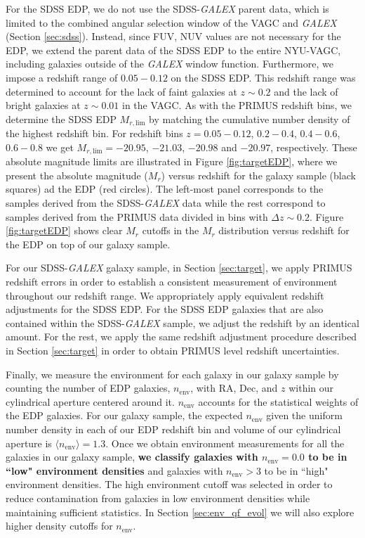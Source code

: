 \documentclass{emulateapj}
\begin{document}
For the SDSS EDP, we do not use the SDSS-{\em GALEX} parent data,
which is limited to the combined angular selection window of the
VAGC and {\em GALEX} (Section \ref{sec:sdss}). Instead, since FUV, NUV
values are not necessary for the EDP, we extend the parent data of the
SDSS EDP to the entire NYU-VAGC, including galaxies outside of the
{\em GALEX} window function. Furthermore, we impose a redshift range
of $0.05-0.12$ on the SDSS EDP. This redshift range was determined to
account for the lack of faint galaxies at $z \sim 0.2$ and the lack of
bright galaxies at $z \sim 0.01$ in the VAGC. As with the PRIMUS
redshift bins, we determine the SDSS EDP $M_{r, \mathrm{lim}}$ by matching
the cumulative number density of the highest redshift bin. For
redshift bins $z = 0.05-0.12$, $0.2-0.4$, $0.4-0.6$, $0.6-0.8$ we get
$M_{r,\mathrm{lim}} = -20.95$, $-21.03$, $-20.98$ and $-20.97$,
respectively. These absolute magnitude limits are illustrated in
Figure \ref{fig:targetEDP}, where we present the absolute magnitude ($M_{r}$) versus redshift for the galaxy sample (black squares) ad the EDP (red circles). 
The left-most panel corresponds to the samples derived from the SDSS-{\em GALEX} data while the rest correspond to samples derived from the PRIMUS data divided in bins with $\Delta z \sim 0.2$. 
Figure \ref{fig:targetEDP} shows clear $M_r$ cutoffs in the
$M_{r}$ distribution versus redshift for the EDP on top
of our galaxy sample.

For our SDSS-{\em GALEX} galaxy sample, in Section \ref{sec:target}, we apply PRIMUS redshift errors in order to establish a consistent measurement of environment throughout our redshift range. We appropriately apply equivalent redshift adjustments for the SDSS EDP. For the SDSS EDP galaxies that are also contained within the SDSS-{\em GALEX} sample, we adjust the redshift by an identical amount. For the rest, we apply the same redshift adjustment procedure described in Section \ref{sec:target} in order to obtain PRIMUS level redshift uncertainties. 

Finally, we measure the environment for each galaxy in our galaxy
sample by counting the number of EDP galaxies, $n_{\mathrm{env}}$, with RA,
Dec, and $z$ within our cylindrical aperture centered around
it. $n_{\mathrm{env}}$ accounts for the statistical weights of the EDP
galaxies. 
For our galaxy sample, the expected $n_{\mathrm{env}}$ given the uniform number density in 
each of our EDP redshift bin and volume of our cylindrical aperture is $\langle n_{\mathrm{env}} \rangle = 1.3$. 
Once we obtain environment measurements for all the galaxies
in our galaxy sample, {\bf we classify galaxies with $n_{\mathrm{env}} = 0.0$
to be in ``low" environment densities} and galaxies with $n_{\mathrm{env}} > 3$
to be in ``high" environment densities. The high environment cutoff was
selected in order to reduce contamination from galaxies in low
environment densities while maintaining sufficient statistics. In
Section \ref{sec:env_qf_evol} we will also explore higher density
cutoffs for $n_{\mathrm{env}}$.
\end{document}
